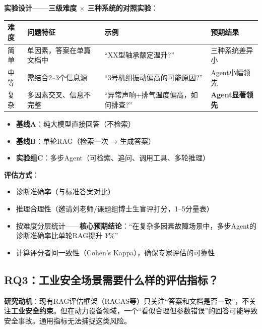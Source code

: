 \documentclass[a4paper, 11pt]{ctexart}
\begin{document}
\textbf{实验设计——三级难度 $\times$ 三种系统的对照实验}：

\begin{table}[H]
\centering
\renewcommand{\arraystretch}{1.2}
\small
\begin{tabular}{p{1.5cm} p{4cm} p{3.5cm} p{3.5cm}}
    \toprule
    \textbf{难度} & \textbf{问题特征} & \textbf{示例} & \textbf{预期结果} \\
    \midrule
    简单 & 单因素，答案在单篇文档中 & ``XX型轴承额定温升?'' & 三种系统差异小 \\
    中等 & 需结合2--3个信息源 & ``3号机组振动偏高的可能原因?'' & Agent小幅领先 \\
    复杂 & 多因素交叉、信息不完整 & ``异常声响+排气温度偏高，如何排查?'' & \textbf{Agent显著领先} \\
    \bottomrule
\end{tabular}
\end{table}

\begin{itemize}
    \item \textbf{基线A}：纯大模型直接回答（不检索）
    \item \textbf{基线B}：单轮RAG（检索一次 → 生成答案）
    \item \textbf{实验组C}：多步Agent（可检索、追问、调用工具、多轮推理）
\end{itemize}

\textbf{评估方式}：
\begin{itemize}
    \item 诊断准确率（与标准答案对比）
    \item 推理合理性（邀请刘老师/课题组博士生盲评打分，1--5分量表）
    \item 按难度分层统计——\textbf{核心预期结论}：``在复杂多因素故障场景中，多步Agent的诊断准确率比单轮RAG提升 $Y\%$''
    \item 计算评分者间一致性（Cohen's Kappa），确保专家评估的可靠性
\end{itemize}



\subsection{RQ3：工业安全场景需要什么样的评估指标？}

\textbf{研究动机}：现有RAG评估框架（RAGAS等）只关注``答案和文档是否一致''，不关注\textbf{工业安全约束}。但在动力设备领域，一个``看似合理但参数错误''的回答可能导致安全事故。通用指标无法捕捉这类风险。
\end{document}
